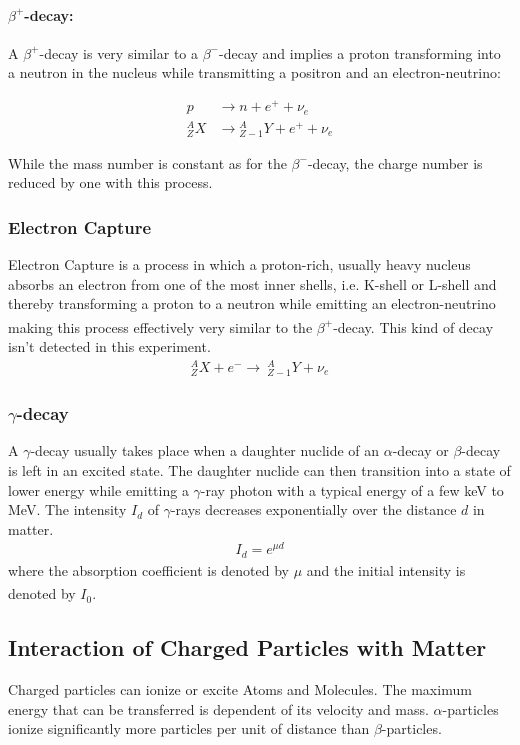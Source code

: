 \documentclass[12pt]{article}
\begin{document}
\paragraph*{$\beta^+$-decay:}
A $\beta^+$-decay is very similar to a $\beta^-$-decay and implies a proton transforming into a neutron in the nucleus while transmitting a positron and an electron-neutrino:

\begin{align}
p &\rightarrow n + e^+ + \nu_e\\
{}_Z^A X &\rightarrow {}_{Z-1}^A Y + e^+ + \nu_e
\end{align}

While the mass number is constant as for the $\beta^-$-decay, the charge number is reduced by one with this process.

\subsubsection{Electron  Capture}
Electron Capture is a process in which a proton-rich, usually heavy nucleus 
absorbs an electron from one of the most inner shells, i.e. K-shell or L-shell and thereby transforming a proton to a neutron while emitting an electron-neutrino making this process effectively very similar to the $\beta^+$-decay. \textsuperscript{\cite{dem}}
This kind of decay isn't detected in this experiment.
\begin{align}
{}_Z^A X + e^- \rightarrow\ {}_{Z-1}^A Y + \nu_e
\end{align}



\subsubsection{$\gamma$-decay}
A $\gamma$-decay usually takes place when a daughter nuclide of an $\alpha$-decay or $\beta$-decay is left in an excited state. The daughter nuclide can then transition into a state of lower energy while emitting a $\gamma$-ray photon with a typical energy of a few keV to MeV.
The intensity $I_d$ of $\gamma$-rays decreases exponentially over the distance $d$ in matter.
\begin{align}
I_d=e^{\mu d}
\end{align}
where the absorption coefficient is denoted by $\mu$ and the initial intensity is denoted by $I_0$.\textsuperscript{\cite{dem}}






\subsection{Interaction of Charged Particles with Matter \label{Interaction}}
Charged particles can ionize or excite Atoms and Molecules. The maximum energy that can be transferred is dependent of its velocity and mass.
$\alpha$-particles ionize significantly more particles per unit of distance than $\beta$-particles.
\end{document}
